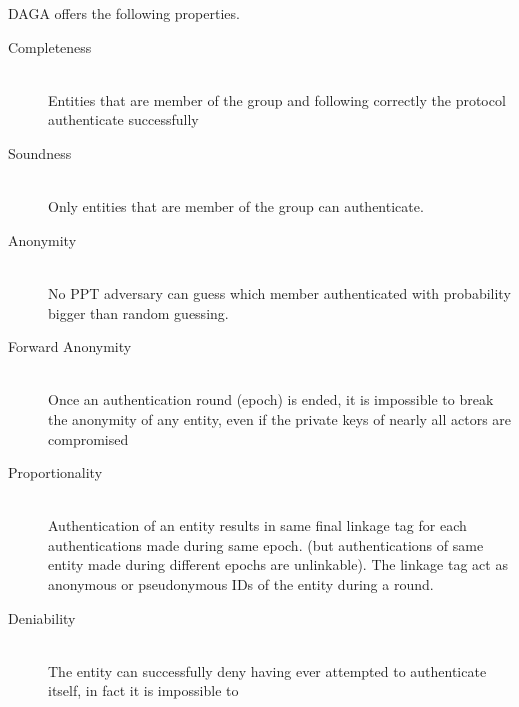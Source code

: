     DAGA offers the following properties. %
    \begin{description}%
        \item[Completeness] \hfill \\
            Entities that are member of the group and following correctly the protocol authenticate successfully
        \item[Soundness] \hfill \\
            Only entities that are member of the group can authenticate.
        \item[Anonymity] \hfill \\
            No PPT adversary can guess which member authenticated with probability bigger than random guessing.
        \item[Forward Anonymity] \hfill \\
            Once an authentication round (epoch) is ended, it is impossible to break the anonymity of any entity,
            even if the private keys of nearly all actors are compromised
        \item[Proportionality] \hfill \\\label{def:proportionality}
            Authentication of an entity results in same final linkage tag for each authentications made during same epoch.
            (but authentications of same entity made during different epochs are unlinkable).
            The linkage tag act as anonymous or pseudonymous IDs of the entity during a round. %
        \item[Deniability] \hfill \\
            The entity can successfully deny having ever attempted to authenticate itself, in fact it is impossible to

\end{description}
